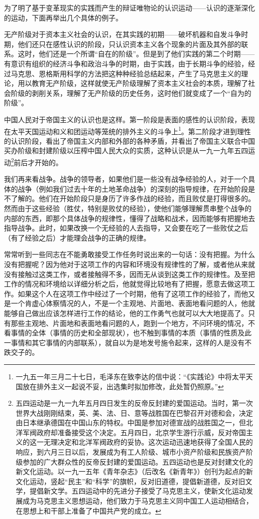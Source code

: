 \documentclass[UTF8, 12pt, a4paper]{ctexrep}
\begin{document}
为了明了基于变革现实的实践而产生的辩证唯物论的认识运动——认识的逐渐深化的运动，下面再举出几个具体的例子。

无产阶级对于资本主义社会的认识，在其实践的初期——破坏机器和自发斗争时期，他们还只在感性认识的阶段，只认识资本主义各个现象的片面及其外部的联系。这时，他们还是一个所谓“自在的阶级”。但是到了他们实践的第二个时期——有意识有组织的经济斗争和政治斗争的时期，由于实践，由于长期斗争的经验，经过马克思、恩格斯用科学的方法把这种种经验总结起来，产生了马克思主义的理论，用以教育无产阶级，这样就使无产阶级理解了资本主义社会的本质，理解了社会阶级的剥削关系，理解了无产阶级的历史任务，这时他们就变成了一个“自为的阶级”。

中国人民对于帝国主义的认识也是这样。第一阶段是表面的感性的认识阶段，表现在太平天国运动和义和团运动等笼统的排外主义的斗争上\footnote{一九五一年三月二十七日，毛泽东在致李达的信中说：“《实践论》中将太平天国放在排外主义一起说不妥，出选集时拟加修改，此处暂仍照原。”}。第二阶段才进到理性的认识阶段，看出了帝国主义内部和外部的各种矛盾，并看出了帝国主义联合中国买办阶级和封建阶级以压榨中国人民大众的实质，这种认识是从一九一九年五四运动\footnote{五四运动是一九一九年五月四日发生的反帝反封建的爱国运动。当时，第一次世界大战刚刚结束，英、美、法、日、意等战胜国在巴黎召开对德和会，决定由日本继承德国在中国山东的特权。中国是参加对德宣战的战胜国之一，但北洋军阀政府却准备接受这个决定。五月四日，北京学生游行示威，反对帝国主义的这一无理决定和北洋军阀政府的妥协。这次运动迅速地获得了全国人民的响应，到六月三日以后，发展成为有工人阶级、城市小资产阶级和民族资产阶级参加的广大群众性的反帝反封建的爱国运动。五四运动也是反对封建文化的新文化运动。以一九一五年《青年杂志》（后改名《新青年》）创刊为起点的新文化运动，竖起“民主”和“科学”的旗帜，反对旧道德，提倡新道德，反对旧文学，提倡新文学。五四运动中的先进分子接受了马克思主义，使新文化运动发展成为马克思主义思想运动，他们致力于马克思主义同中国工人运动相结合，在思想上和干部上准备了中国共产党的成立。}前后才开始的。

我们再来看战争。战争的领导者，如果他们是一些没有战争经验的人，对于一个具体的战争（例如我们过去十年的土地革命战争）的深刻的指导规律，在开始阶段是不了解的。他们在开始阶段只是身历了许多作战的经验，而且败仗是打得很多的。然而由于这些经验（胜仗，特别是败仗的经验），使他们能够理解贯串整个战争的内部的东西，即那个具体战争的规律性，懂得了战略和战术，因而能够有把握地去指导战争。此时，如果改换一个无经验的人去指导，又会要在吃了一些败仗之后（有了经验之后）才能理会战争的正确的规律。

常常听到一些同志在不能勇敢接受工作任务时说出来的一句话：没有把握。为什么没有把握呢？因为他对于这项工作的内容和环境没有规律性的了解，或者他从来就没有接触过这类工作，或者接触得不多，因而无从谈到这类工作的规律性。及至把工作的情况和环境给以详细分析之后，他就觉得比较地有了把握，愿意去做这项工作。如果这个人在这项工作中经过了一个时期，他有了这项工作的经验了，而他又是一个肯虚心体察情况的人，不是一个主观地、片面地、表面地看问题的人，他就能够自己做出应该怎样进行工作的结论，他的工作勇气也就可以大大地提高了。只有那些主观地、片面地和表面地看问题的人，跑到一个地方，不问环境的情况，不看事情的全体（事情的历史和全部现状），也不触到事情的本质（事情的性质及此一事情和其它事情的内部联系），就自以为是地发号施令起来，这样的人是没有不跌交子的。
\end{document}
